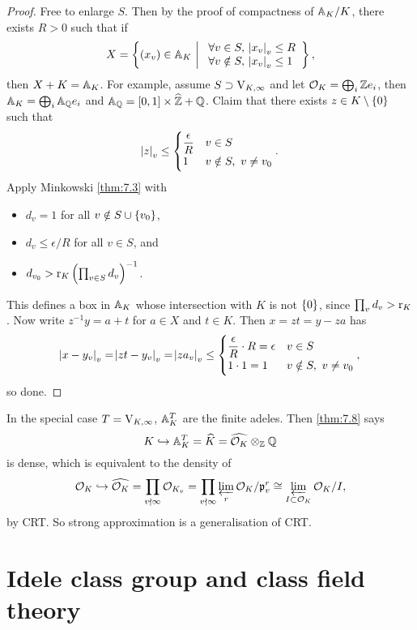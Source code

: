 \begin{proof}
Free to enlarge $ S $. Then by the proof of compactness of $ \AA_K / K $, there exists $ R > 0 $ such that if
$$ X = \cbr{\br{x_v} \in \AA_K \st \begin{array}{l} \forall v \in S, \ \abs{x_v}_v \le R \\ \forall v \notin S, \ \abs{x_v}_v \le 1 \end{array}}, $$
then $ X + K = \AA_K $. For example, assume $ S \supset \V_{K, \infty} $ and let $ \OOO_K = \bigoplus_i \ZZ e_i $, then $ \AA_K = \bigoplus_i \AA_\QQ e_i $ and $ \AA_\QQ = \sbr{0, 1} \times \widehat{\ZZ} + \QQ $. Claim that there exists $ z \in K \setminus \cbr{0} $ such that
$$ \abs{z}_v \le
\begin{cases}
\dfrac{\epsilon}{R} & v \in S \\
1 & v \notin S, \ v \ne v_0
\end{cases}.
$$
Apply Minkowski \ref{thm:7.3} with
\begin{itemize}
\item $ d_v = 1 $ for all $ v \notin S \cup \cbr{v_0} $,
\item $ d_v \le \epsilon / R $ for all $ v \in S $, and
\item $ d_{v_0} > \r_K\br{\prod_{v \in S} d_v}^{-1} $.
\end{itemize}
This defines a box in $ \AA_K $ whose intersection with $ K $ is not $ \cbr{0} $, since $ \prod_v d_v > \r_K $. Now write $ z^{-1}y = a + t $ for $ a \in X $ and $ t \in K $. Then $ x = zt = y - za $ has
$$ \abs{x - y_v}_v = \abs{zt - y_v}_v = \abs{za_v}_v \le
\begin{cases}
\dfrac{\epsilon}{R} \cdot R = \epsilon & v \in S \\
1 \cdot 1 = 1 & v \notin S, \ v \ne v_0
\end{cases},
$$
so done.
\end{proof}

In the special case $ T = \V_{K, \infty} $, $ \AA_K^T $ are the finite adeles. Then \ref{thm:7.8} says
$$ K \hookrightarrow \AA_K^T = \widehat{K} = \widehat{\OOO_K} \otimes_\ZZ \QQ $$
is dense, which is equivalent to the density of
$$ \OOO_K \hookrightarrow \widehat{\OOO_K} = \prod_{v \nmid \infty} \OOO_{K_v} = \prod_{v \nmid \infty} \varprojlim_r \OOO_K / \ppp_v^r \cong \varprojlim_{I \subset \OOO_K} \OOO_K / I, $$
by CRT. So strong approximation is a generalisation of CRT.

\pagebreak

\section{Idele class group and class field theory}

